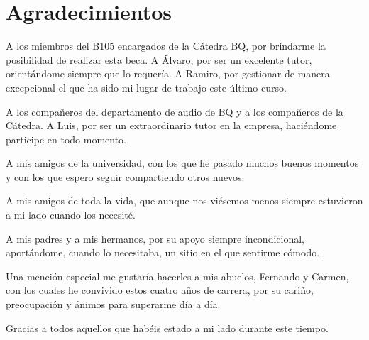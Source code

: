 \chapter*{Agradecimientos}


\bigskip
\bigskip
\bigskip

A los miembros del B105 encargados de la Cátedra BQ, por brindarme la posibilidad de realizar esta beca. A Álvaro, por ser un excelente tutor, orientándome siempre que lo requería. A Ramiro, por gestionar de manera excepcional el que ha sido mi lugar de trabajo este último curso.

A los compañeros del departamento de audio de BQ y a los compañeros de la Cátedra. A Luis, por ser un extraordinario tutor en la empresa, haciéndome participe en todo momento.

A mis amigos de la universidad, con los que he pasado muchos buenos momentos y con los que espero seguir compartiendo otros nuevos.

A mis amigos de toda la vida, que aunque nos viésemos menos siempre estuvieron a mi lado cuando los necesité.

A mis padres y a mis hermanos, por su apoyo siempre incondicional, aportándome, cuando lo necesitaba, un sitio en el que sentirme cómodo.

Una mención especial me gustaría hacerles a mis abuelos, Fernando y Carmen, con los cuales he convivido estos cuatro años de carrera, por su cariño, preocupación y ánimos para superarme día a día.

Gracias a todos aquellos que habéis estado a mi lado durante este tiempo.